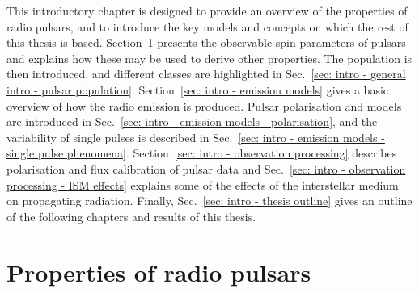This introductory chapter is designed to provide an overview of the properties of radio pulsars, and to introduce the key models and concepts on which the rest of this thesis is based. Section~\ref{sec: intro - general intro} presents the observable spin parameters of pulsars and explains how these may be used to derive other properties. The population is then introduced, and different classes are highlighted in Sec.~\ref{sec: intro - general intro - pulsar population}. Section~\ref{sec: intro - emission models} gives a basic overview of how the radio emission is produced. Pulsar polarisation and models are introduced in Sec.~\ref{sec: intro - emission models - polarisation}, and the variability of single pulses is described in Sec.~\ref{sec: intro - emission models - single pulse phenomena}. Section~\ref{sec: intro - observation processing} describes polarisation and flux calibration of pulsar data and Sec.~\ref{sec: intro - observation processing - ISM effects} explains some of the effects of the interstellar medium on propagating radiation. Finally, Sec.~\ref{sec: intro - thesis outline} gives an outline of the following chapters and results of this thesis.












\section{Properties of radio pulsars}
\label{sec: intro - general intro}

